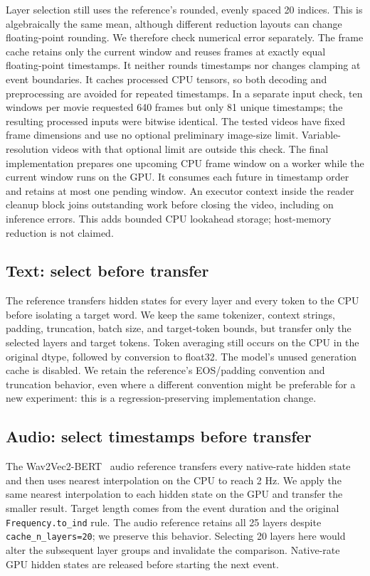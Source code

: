 \documentclass[10pt]{article}
\begin{document}
Layer selection still uses the reference's rounded, evenly spaced 20 indices.
This is algebraically the same mean, although different reduction layouts can
change floating-point rounding. We therefore check numerical error separately.
The frame cache retains only the current window and reuses frames at exactly
equal floating-point timestamps. It neither rounds timestamps nor changes
clamping at event boundaries. It caches processed CPU tensors, so both decoding
and preprocessing are avoided for repeated timestamps. In a separate input
check, ten windows per movie requested 640 frames but only 81 unique timestamps;
the resulting processed inputs were bitwise identical. The tested videos have
fixed frame dimensions and use no optional preliminary image-size limit.
Variable-resolution videos with that optional limit are outside this check.
The final implementation prepares one upcoming CPU frame window on a worker
while the current window runs on the GPU. It consumes each future in timestamp
order and retains at most one pending window. An executor context inside the
reader cleanup block joins outstanding work before closing the video, including
on inference errors. This adds bounded CPU lookahead storage; host-memory
reduction is not claimed.

\subsection{Text: select before transfer}
The reference transfers hidden states for every layer and every token to the
CPU before isolating a target word. We keep the same tokenizer, context strings,
padding, truncation, batch size, and target-token bounds, but transfer only the
selected layers and target tokens. Token averaging still occurs on the CPU in
the original dtype, followed by conversion to float32. The model's unused
generation cache is disabled. We retain the reference's EOS/padding convention
and truncation behavior, even where a different convention might be preferable
for a new experiment: this is a regression-preserving implementation change.

\subsection{Audio: select timestamps before transfer}
The Wav2Vec2-BERT~\cite{hfaudio} audio reference transfers every native-rate hidden state and then uses nearest
interpolation on the CPU to reach 2 Hz. We apply the same nearest interpolation
to each hidden state on the GPU and transfer the smaller result. Target length
comes from the event duration and the original \texttt{Frequency.to\_ind} rule.
The audio reference retains all 25 layers despite \texttt{cache\_n\_layers=20};
we preserve this behavior. Selecting 20 layers here would alter the subsequent
layer groups and invalidate the comparison.
Native-rate GPU hidden states are released before starting the next event.
\end{document}
